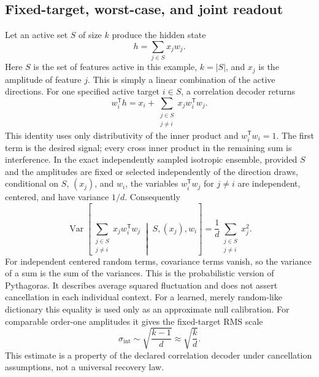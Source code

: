\documentclass[
  aps,
  reprint,
  superscriptaddress,
  floatfix,
  nofootinbib,
  longbibliography
]{revtex4-2}
\newcommand{\sint}{\sigma_{\mathrm{int}}}
\newcommand{\T}{^{\mathsf{T}}}
\DeclareMathOperator{\Var}{Var}
\begin{document}
\subsection{Fixed-target, worst-case, and joint readout}

Let an active set $S$ of size $k$ produce the hidden state
\begin{equation}
\label{eq:hidden}
h=\sum_{j\in S}x_jw_j .
\end{equation}
Here $S$ is the set of features active in this example, $k=|S|$, and $x_j$
is the amplitude of feature $j$.  This is simply a linear combination of the
active directions.
For one specified active target $i\in S$, a correlation decoder returns
\begin{equation}
\label{eq:readout}
w_i\T h
=x_i+
\sum_{\substack{j\in S\\j\ne i}}
x_jw_i\T w_j.
\end{equation}
This identity uses only distributivity of the inner product and
$w_i\T w_i=1$.  The first term is the desired signal; every cross inner
product in the remaining sum is interference.
In the exact independently sampled isotropic ensemble, provided $S$ and the
amplitudes are fixed or selected independently of the direction draws,
conditional on $S$, $(x_j)$, and $w_i$, the variables $w_i\T w_j$ for $j\ne i$
are independent, centered, and have variance $1/d$.  Consequently
\begin{equation}
\label{eq:intvar}
\Var\!\left[
\sum_{\substack{j\in S\\j\ne i}}
x_jw_i\T w_j
\;\middle|\;S,(x_j),w_i
\right]
=
\frac{1}{d}
\sum_{\substack{j\in S\\j\ne i}}x_j^2 .
\end{equation}
For independent centered random terms, covariance terms vanish, so the
variance of a sum is the sum of the variances.  This is the probabilistic
version of Pythagoras.  It describes average squared fluctuation and does not
assert cancellation in each individual context.
For a learned, merely random-like dictionary this equality is used only as an
approximate null calibration.  For comparable order-one amplitudes it gives
the fixed-target RMS scale
\begin{equation}
\label{eq:sint}
\sint
\sim\sqrt{\frac{k-1}{d}}
\approx\sqrt{\frac{k}{d}}.
\end{equation}
This estimate is a property of the declared correlation decoder under
cancellation assumptions, not a universal recovery law.
\end{document}
